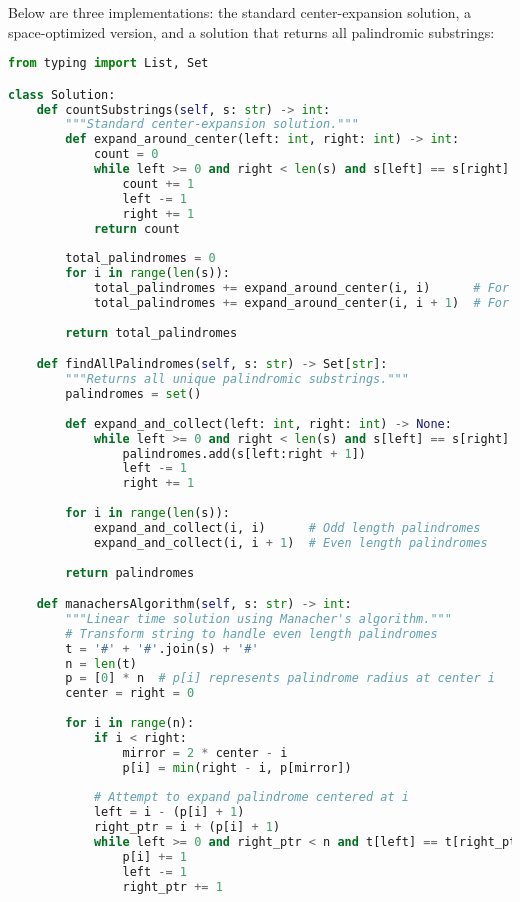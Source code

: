 Below are three implementations: the standard center-expansion solution, a space-optimized version, and a solution that returns all palindromic substrings:

\begin{fullwidth}
\begin{lstlisting}[language=Python]
from typing import List, Set

class Solution:
    def countSubstrings(self, s: str) -> int:
        """Standard center-expansion solution."""
        def expand_around_center(left: int, right: int) -> int:
            count = 0
            while left >= 0 and right < len(s) and s[left] == s[right]:
                count += 1
                left -= 1
                right += 1
            return count
        
        total_palindromes = 0
        for i in range(len(s)):
            total_palindromes += expand_around_center(i, i)      # For odd lengths
            total_palindromes += expand_around_center(i, i + 1)  # For even lengths
        
        return total_palindromes

    def findAllPalindromes(self, s: str) -> Set[str]:
        """Returns all unique palindromic substrings."""
        palindromes = set()
        
        def expand_and_collect(left: int, right: int) -> None:
            while left >= 0 and right < len(s) and s[left] == s[right]:
                palindromes.add(s[left:right + 1])
                left -= 1
                right += 1
        
        for i in range(len(s)):
            expand_and_collect(i, i)      # Odd length palindromes
            expand_and_collect(i, i + 1)  # Even length palindromes
            
        return palindromes

    def manachersAlgorithm(self, s: str) -> int:
        """Linear time solution using Manacher's algorithm."""
        # Transform string to handle even length palindromes
        t = '#' + '#'.join(s) + '#'
        n = len(t)
        p = [0] * n  # p[i] represents palindrome radius at center i
        center = right = 0
        
        for i in range(n):
            if i < right:
                mirror = 2 * center - i
                p[i] = min(right - i, p[mirror])
            
            # Attempt to expand palindrome centered at i
            left = i - (p[i] + 1)
            right_ptr = i + (p[i] + 1)
            while left >= 0 and right_ptr < n and t[left] == t[right_ptr]:
                p[i] += 1
                left -= 1
                right_ptr += 1
            

\end{lstlisting}
\end{fullwidth}
